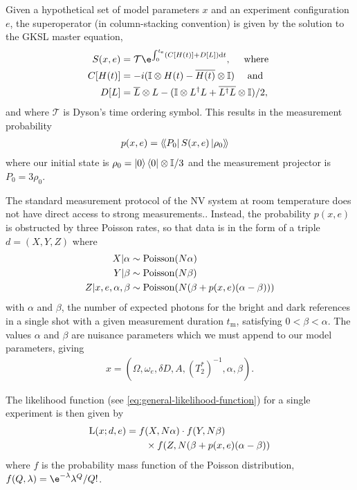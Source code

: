 \documentclass[aps,nofootinbib,twocolumn,superscriptaddress]{revtex4}
\newcommand{\mps}{x}
\newcommand{\eps}{e}
\newcommand{\data}{d}
\newcommand{\te}{t_\text{e}}
\newcommand{\tm}{t_\text{m}}
\renewcommand{\H}{H}    %
\renewcommand{\L}{L}    %
\renewcommand{\S}{S}    %
\begin{document}
Given a hypothetical set of model parameters $\mps$ and 
an experiment configuration $\eps$, the superoperator
(in column-stacking convention) is given by the solution
to the GKSL master equation,
\begin{subequations}
\begin{align}
    S(\mps,\eps)
        &=\mathcal{T}\e^{\int_0^{\te}(C[\H(t)]+D[\L])\dd t}, 
        \quad\text{ where } \\
    C[\H(t)]
        &=-i(\I\otimes\H(t)-\overline{\H(t)}\otimes\I) 
        \quad\text{ and } \\
    D[L] 
        &= \overline{L}\otimes L
            -(\I\otimes L^\dagger L + \overline{L^\dagger L}\otimes \I) / 2,
\end{align}
\end{subequations}
and where $\mathcal{T}$ is Dyson's time ordering symbol.
This results in the measurement probability
\begin{align}
    p(\mps,\eps)
        &=  \dbra{P_0} \S(\mps,\eps)\dket{\rho_0}
\end{align}
where our initial state is $\rho_0=\ket{0}\bra{0}\otimes\mathbb{I}/3$
and the measurement projector is $P_0=3\rho_0$.

The standard measurement protocol of the NV system at room
temperature does not have direct access to strong measurements..
Instead, the probability $p(\mps,\eps)$ is obstructed by three Poisson
rates, so that data is in the form of a triple $\data=(X,Y,Z)$
where
\begin{subequations}
\begin{align}
    X|\alpha
        & \sim\poissondist(N\alpha) \\
    Y|\beta
        & \sim\poissondist(N\beta) \\
    Z|\mps,\eps,\alpha,\beta
        & \sim\poissondist(N(\beta+p(\mps,\eps)(\alpha-\beta)))
\end{align}
\label{eq:nv-measurement}
\end{subequations}
with $\alpha$ and $\beta$,
the number of expected
photons for the bright and dark references in a single shot with a 
given measurement duration $\tm$,
 satisfying $0<\beta<\alpha$.
The values $\alpha$ and $\beta$ are nuisance parameters which we
must append to our model parameters, giving
\begin{align}
    \mps=(\Omega,\omega_e,\delta D,A,(T_2^*)^{-1},\alpha,\beta).
    \label{eq:nv-model-parameters}
\end{align}

The likelihood function (see \autoref{eq:general-likelihood-function}) 
for a single experiment is then given by
\begin{align}
    \Lhood(\mps;\data,\eps) 
        &= f(X,N\alpha)
            \cdot f(Y, N\beta) \nonumber \\
            &\quad\quad\times f(Z, N(\beta+p(\mps,\eps)(\alpha-\beta))
    \label{eq:likelihood-function}
\end{align}
where $f$ is the probability mass function of the Poisson distribution,
$f(Q,\lambda) = \e^{-\lambda}\lambda^Q/Q!$.
\end{document}
